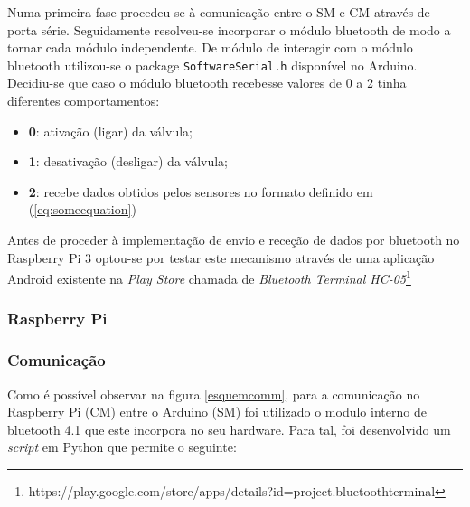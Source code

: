 Numa primeira fase procedeu-se à comunicação entre o \ac{SM} e \ac{CM} através de porta série. Seguidamente resolveu-se incorporar o módulo bluetooth de modo a tornar cada módulo independente. De módulo de interagir com o módulo bluetooth utilizou-se o package \texttt{SoftwareSerial.h} disponível no Arduino. Decidiu-se que caso o módulo bluetooth recebesse valores de 0 a 2 tinha diferentes comportamentos: 

\begin{itemize}
	\item \textbf{0}: ativação (ligar) da válvula; 
	\item \textbf{1}: desativação (desligar) da válvula; 
	\item \textbf{2}: recebe dados obtidos pelos sensores no formato definido em (\ref{eq:someequation})
\end{itemize}

Antes de proceder à implementação de envio e receção de dados por bluetooth no Raspberry Pi 3 optou-se por testar este mecanismo através de uma aplicação Android existente na \textit{Play Store} chamada de \textit{Bluetooth Terminal HC-05}\footnote{https://play.google.com/store/apps/details?id=project.bluetoothterminal}

\subsubsection{Raspberry Pi}


\subsubsection{Comunicação}


Como é possível observar na figura \ref{esquemcomm}, para a comunicação no Raspberry Pi (\ac{CM}) entre o Arduino (\ac{SM}) foi utilizado o modulo interno de bluetooth 4.1 que este incorpora no seu hardware. Para tal, foi desenvolvido um \textit{script} em Python que permite o seguinte: 


